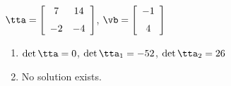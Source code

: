 {$\tta = \left[ \begin {array}{cc} 7&14\\\noalign{\medskip}-2&-4\end {array}
 \right] $,
 \quad
$\vb = \left[ \begin {array}{c} -1\\\noalign{\medskip}4\end {array} \right]$}
{\begin{enumerate}
\item	$\det{\tta} = 0$, $\det{\tta_1} = -52$, $\det{\tta_2} = 26$
\item No solution exists.
\end{enumerate}
}
 


 

